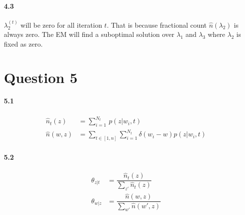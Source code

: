 \documentclass[10pt,letter]{article}
\begin{document}
\paragraph*{4.3}
$\lambda_2^{(t)}$ will be zero for all iteration $t$. That is because fractional count $\hat{n}(\lambda_2)$ is always zero. The EM will find a suboptimal solution over $\lambda_1$ and $\lambda_3$ where $\lambda_2$ is fixed as zero.






\section*{Question 5}

\paragraph*{5.1}
\begin{align*}
\hat{n}_t(z) &= \sum_{i=1}^{N_t} \, p(z|w_i,t) \\
\hat{n}(w,z) &= \sum_{t\in[1,n]} \sum_{i=1}^{N_t} \delta(w_i-w) p(z|w_i,t)
\end{align*}

\paragraph*{5.2}
\begin{align*}
\theta_{z|t} &= \dfrac{\hat{n}_t(z)}{\sum_{z'} \hat{n}_t(z)}\\
\theta_{w|z} &= \dfrac{\hat{n}(w,z)}{\sum_{w'} \hat{n}(w',z)}
\end{align*}
\end{document}
